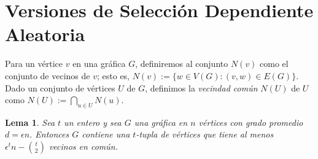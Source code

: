 \documentclass[12pt]{article}
\newtheorem{lema}[section]{Lema}
\begin{document}
\section*{Versiones de Selección Dependiente Aleatoria}

Para un vértice $v$ en una gráfica $G$, definiremos al conjunto $N(v)$ como el
conjunto de vecinos de $v$; esto es, $N(v) := \{w \in V(G): (v, w) \in E(G)\}$.
Dado un conjunto de vértices $U$ de $G$, definimos la \textit{vecindad común}
$N(U)$ de $U$ como $N(U) := \bigcap_{u \in U} N(u)$.  

\begin{lema}
    Sea $t$ un entero y sea $G$ una gráfica en $n$ vértices con grado promedio
    $d = \epsilon n$. Entonces $G$ contiene una $t$-tupla de vértices que tiene 
    al menos $\epsilon^t n - \binom{t}{2}$ vecinos en común.
\end{lema}
\end{document}
